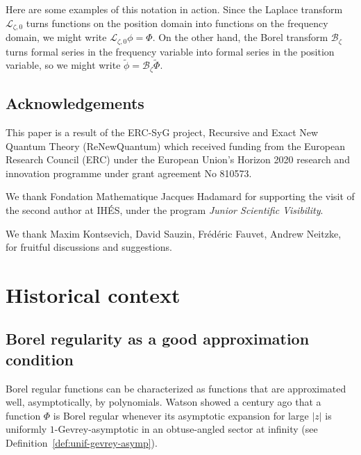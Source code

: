 \documentclass{article}
\newcommand{\series}[1]{\tilde{#1}}
\newcommand{\laplace}{\mathcal{L}}
\newcommand{\borel}{\mathcal{B}}
\theoremstyle{definition}
\theoremstyle{plain}
\begin{document}
Here are some examples of this notation in action. Since the Laplace transform $\laplace_{\zeta, 0}$ turns functions on the position domain into functions on the frequency domain, we might write $\laplace_{\zeta,0} \phi = \Phi$. On the other hand, the Borel transform $\borel_\zeta$ turns formal series in the frequency variable into formal series in the position variable, so we might write $\series{\phi} = \borel_\zeta \series{\Phi}$.
%
\subsection{Acknowledgements}
This paper is a result of the ERC-SyG project, Recursive and Exact New Quantum Theory (ReNewQuantum) which received funding from the European Research Council (ERC) under the European Union's Horizon 2020 research and innovation programme under grant agreement No 810573. 

We thank Fondation Mathematique Jacques Hadamard for supporting the visit of the second author at IH\'ES, under the program \textit{Junior Scientific Visibility}. 

We thank Maxim Kontsevich, David Sauzin, Fr\'ed\'eric Fauvet, Andrew Neitzke, for fruitful discussions and suggestions. 
%
\section{Historical context}\label{sec:historical-context}
%
\subsection{Borel regularity as a good approximation condition}
Borel regular functions can be characterized as functions that are approximated well, asymptotically, by polynomials. Watson showed a century ago \cite[Part II, Section 9]{watson2} that a function $\Phi$ is Borel regular whenever its asymptotic expansion for large $|z|$ is uniformly $1$-Gevrey-asymptotic in an obtuse-angled sector at infinity (see Definition~\ref{def:unif-gevrey-asymp}).
\end{document}
